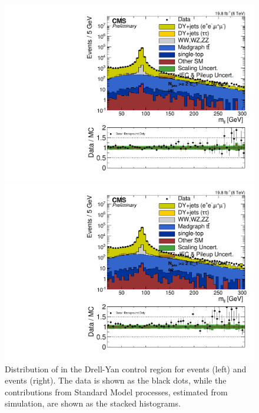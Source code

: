\begin{figure}[htbp]
\centering
\begin{minipage}[t]{0.49\textwidth}
  \includegraphics[width=\textwidth]{plots/BG/rmue/DrellYanControl_Mll_Full2012_MuMu_TopReweighted.pdf}
\end{minipage}
\begin{minipage}[t]{0.49\textwidth}
\includegraphics[width=\textwidth]{plots/BG/rmue/DrellYanControl_Mll_Full2012_EE_TopReweighted.pdf}
\end{minipage}
\caption{Distribution of \mll in the Drell-Yan control region for \MM events (left) and \EE events (right). The data is shown as the black dots, while the contributions from Standard Model processes, estimated from simulation, are shown as the stacked histograms.}
\label{fig:rmueMll}
\end{figure} 
